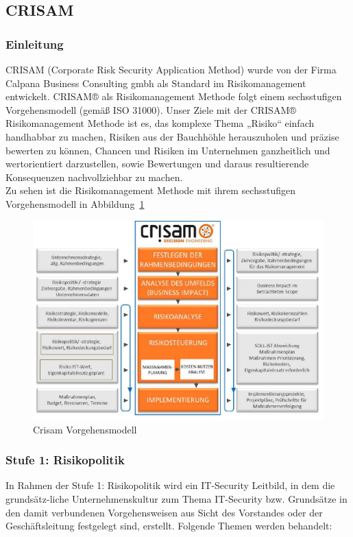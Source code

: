 \subsection{CRISAM}
\subsubsection{Einleitung}

CRISAM (Corporate Risk Security Application Method) wurde von der Firma Calpana Business Consulting gmbh als Standard im Risikomanagement entwickelt. CRISAM® als Risikomanagement Methode folgt einem sechsstufigen Vorgehensmodell (gemäß ISO 31000). Unser Ziele mit der CRISAM® Risikomanagement Methode ist es,  das komplexe Thema „Risiko“ einfach handhabbar zu machen, Risiken aus der Bauchhöhle herauszuholen und präzise bewerten zu können, Chancen und Risiken im Unternehmen ganzheitlich und wertorientiert darzustellen, sowie Bewertungen und daraus resultierende Konsequenzen nachvollziehbar zu machen.
\\

Zu sehen ist die Risikomanagement Methode mit ihrem sechsstufigen Vorgehensmodell in Abbildung~\ref{fig:Vorgehensmodell}

\begin{figure}[htbp]
\centering
\includegraphics[scale =0.5 ]{images/Vorgehensmodell}
\caption{Crisam Vorgehensmodell}
\label{fig:Vorgehensmodell}
\end{figure}


	
\subsubsection {Stufe 1: Risikopolitik}
In Rahmen der Stufe 1: Risikopolitik wird ein IT-Security Leitbild, in dem die grundsätz-liche Unternehmenskultur zum Thema IT-Security bzw. Grundsätze in den damit verbundenen Vorgehensweisen aus Sicht des Vorstandes oder der Geschäftsleitung festgelegt sind, erstellt. Folgende Themen werden behandelt:\\

